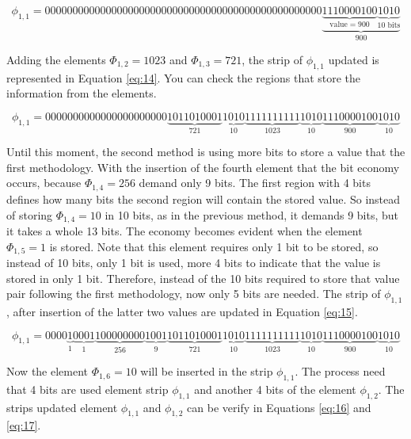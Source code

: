 \documentclass[10pt]{article}
\begin{document}
\begin{equation} \label{eq:13}
 \phi_{1,1} = 00000000000000000000000000000000000000000000000000\underbrace{\underbrace{1110000100}_{\text{value} = 900}\underbrace{1010}_{\text{10 bits}}}_{900}
\end{equation}

Adding the elements $\Phi_{1,2}=1023$ and $\Phi_{1,3}=721$, the strip of $\phi_{1,1}$ updated is represented in Equation \ref{eq:14}. You can check the regions that store the information from the elements.

\begin{equation} \label{eq:14}
 \phi_{1,1} = 
 0000000000000000000000\underbrace{1011010001}_{721}\underbrace{1010}_{10}\underbrace{1111111111}_{1023}\underbrace{1010}_{10}\underbrace{1110000100}_{900}\underbrace{1010}_{10}
\end{equation}

Until this moment, the second method is using more bits to store a value that the first methodology. With the insertion of the fourth element that the bit economy occurs, because $\Phi_{1,4}=256$ demand only 9 bits. The first region with 4 bits defines how many bits the second region will contain the stored value. So instead of storing $\Phi_{1,4}=10$ in 10 bits, as in the previous method, it demands 9 bits, but it takes a whole 13 bits. The economy becomes evident when the element $\Phi_{1,5}=1$ is stored. Note that this element requires only 1 bit to be stored, so instead of 10 bits, only 1 bit is used, more 4 bits to indicate that the value is stored in only 1 bit. Therefore, instead of the 10 bits required to store that value pair following the first methodology, now only 5 bits are needed. The strip of $\phi_{1,1}$, after insertion of the latter two values ​​are updated in Equation \ref{eq:15}.

\begin{equation} \label{eq:15}
 \phi_{1,1} =
 0000\underbrace{1}_{1}\underbrace{0001}_{1}\underbrace{100000000}_{256}\underbrace{1001}_{9}\underbrace{1011010001}_{721}\underbrace{1010}_{10}\underbrace{1111111111}_{1023}\underbrace{1010}_{10}\underbrace{1110000100}_{900}\underbrace{1010}_{10}
\end{equation}

Now the element $\Phi_{1,6}=10$ will be inserted in the strip $\phi_{1,1}$. The process need that 4 bits are used element strip $\phi_{1,1}$ and another 4 bits of the element $\phi_{1,2}$. The strips updated element $\phi_{1,1}$ and $\phi_{1,2}$ can be verify in Equations \ref{eq:16} and \ref{eq:17}.
\end{document}

